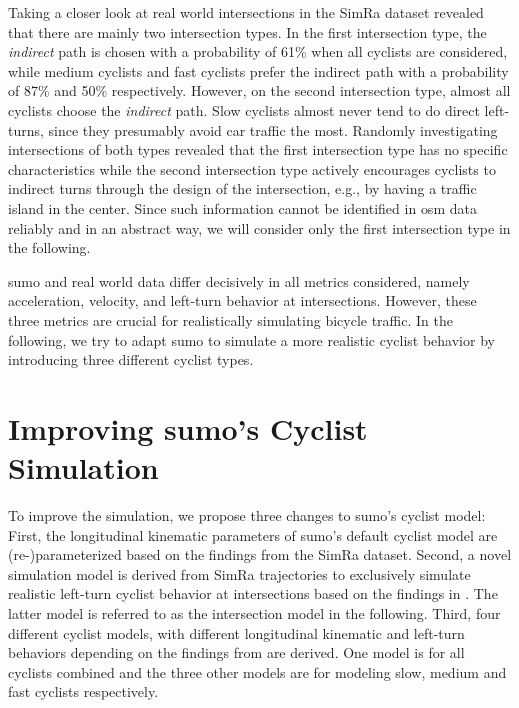 Taking a closer look at real world intersections in the SimRa dataset revealed that there are mainly two intersection types.
In the first intersection type, the \textit{indirect} path is chosen with a probability of \num{61}\% when all cyclists are considered, while medium cyclists and fast cyclists prefer the indirect path with a probability of \num{87}\% and \num{50}\% respectively.
However, on the second intersection type, almost all cyclists choose the \textit{indirect} path.
Slow cyclists almost never tend to do direct left-turns, since they presumably avoid car traffic the most.
Randomly investigating intersections of both types revealed that the first intersection type has no specific characteristics while the second intersection type actively encourages cyclists to indirect turns through the design of the intersection, e.g., by having a traffic island in the center.
Since such information cannot be identified in \ac{osm} data reliably and in an abstract way, we will consider only the first intersection type in the following.

\ac{sumo} and real world data differ decisively in all metrics considered, namely acceleration, velocity, and left-turn behavior at intersections.
However, these three metrics are crucial for realistically simulating bicycle traffic.
In the following, we try to adapt \ac{sumo} to simulate a more realistic cyclist behavior by introducing three different cyclist types.


\section{Improving \ac{sumo}'s Cyclist Simulation}
\label{sec:improving_sumos_bicycle_simulation}
To improve the simulation, we propose three changes to \ac{sumo}'s cyclist model:
First, the longitudinal kinematic parameters of \ac{sumo}'s default cyclist model are \mbox{(re-)}parameterized based on the findings from the SimRa dataset.
Second, a novel simulation model is derived from SimRa trajectories to exclusively simulate realistic left-turn cyclist behavior at intersections based on the findings in .
The latter model is referred to as the intersection model in the following.
Third, four different cyclist models, with different longitudinal kinematic and left-turn behaviors depending on the findings from  are derived.
One model is for all cyclists combined and the three other models are for modeling slow, medium and fast cyclists respectively.



